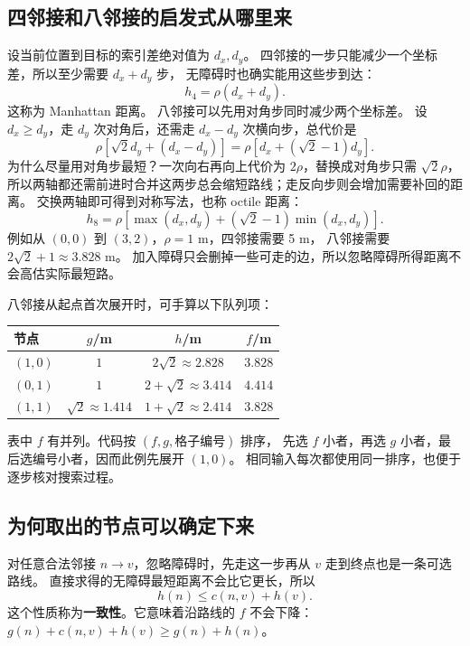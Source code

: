 \subsection{四邻接和八邻接的启发式从哪里来}
设当前位置到目标的索引差绝对值为 $d_x,d_y$。
四邻接的一步只能减少一个坐标差，所以至少需要 $d_x+d_y$ 步，
无障碍时也确实能用这些步到达：
\begin{equation}h_4=\rho(d_x+d_y).\end{equation}
这称为 Manhattan 距离。
八邻接可以先用对角步同时减少两个坐标差。
设 $d_x\geq d_y$，走 $d_y$ 次对角后，还需走 $d_x-d_y$ 次横向步，总代价是
\begin{equation}
\rho[\sqrt2d_y+(d_x-d_y)]
=\rho[d_x+(\sqrt2-1)d_y].
\end{equation}
为什么尽量用对角步最短？一次向右再向上代价为 $2\rho$，替换成对角步只需 $\sqrt2\rho$，
所以两轴都还需前进时合并这两步总会缩短路线；走反向步则会增加需要补回的距离。
交换两轴即可得到对称写法，也称 octile 距离：
\begin{equation}
h_8=\rho[\max(d_x,d_y)+(\sqrt2-1)\min(d_x,d_y)].
\end{equation}
例如从 $(0,0)$ 到 $(3,2)$，$\rho=1$ m，四邻接需要 5 m，
八邻接需要 $2\sqrt2+1\approx3.828$ m。
加入障碍只会删掉一些可走的边，所以忽略障碍所得距离不会高估实际最短路。

八邻接从起点首次展开时，可手算以下队列项：
\begin{center}\small
\begin{tabular}{lccc}\toprule
节点 & $g$/m & $h$/m & $f$/m\\\midrule
$(1,0)$ & $1$ & $2\sqrt2\approx2.828$ & $3.828$\\
$(0,1)$ & $1$ & $2+\sqrt2\approx3.414$ & $4.414$\\
$(1,1)$ & $\sqrt2\approx1.414$ & $1+\sqrt2\approx2.414$ & $3.828$\\\bottomrule
\end{tabular}
\end{center}
表中 $f$ 有并列。代码按 $(f,g,\text{格子编号})$ 排序，
先选 $f$ 小者，再选 $g$ 小者，最后选编号小者，因而此例先展开 $(1,0)$。
相同输入每次都使用同一排序，也便于逐步核对搜索过程。

\subsection{为何取出的节点可以确定下来}
对任意合法邻接 $n\to v$，忽略障碍时，先走这一步再从 $v$ 走到终点也是一条可选路线。
直接求得的无障碍最短距离不会比它更长，所以
\begin{equation}h(n)\leq c(n,v)+h(v).\end{equation}
这个性质称为\textbf{一致性}。它意味着沿路线的 $f$ 不会下降：
$g(n)+c(n,v)+h(v)\geq g(n)+h(n)$。

